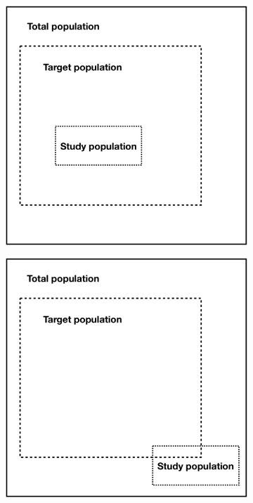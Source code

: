 \begin{figure}[h]
\centering
\begin{subfigure}{0.45\linewidth}
    \includegraphics[width=\linewidth]{main_figures/discussion/populations_1.png}
    \caption{}
    \label{fig:statistical_populations1}
\end{subfigure}
\hfill
\begin{subfigure}{0.45\linewidth}
    \includegraphics[width=\linewidth]{main_figures/discussion/populations_2.png}

\end{subfigure}
\end{figure}
